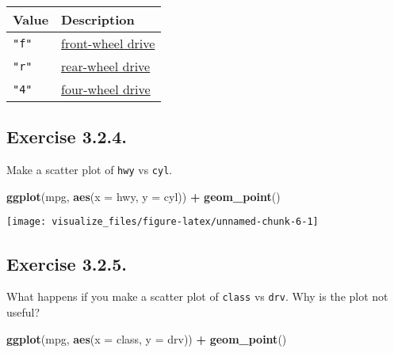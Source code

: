 \documentclass[]{book}
\newenvironment{Shaded}{\begin{snugshade}}{\end{snugshade}}
\newcommand{\DataTypeTok}[1]{\textcolor[rgb]{0.13,0.29,0.53}{#1}}
\newcommand{\KeywordTok}[1]{\textcolor[rgb]{0.13,0.29,0.53}{\textbf{#1}}}
\newcommand{\NormalTok}[1]{#1}
\newcommand{\OperatorTok}[1]{\textcolor[rgb]{0.81,0.36,0.00}{\textbf{#1}}}
\newcommand{\StringTok}[1]{\textcolor[rgb]{0.31,0.60,0.02}{#1}}
\theoremstyle{plain}
\theoremstyle{remark}
\theoremstyle{definition}
\theoremstyle{definition}
\theoremstyle{definition}
\theoremstyle{remark}
\begin{document}
\begin{longtable}[]{@{}ll@{}}
\toprule
Value & Description\tabularnewline
\midrule
\endhead
\texttt{"f"} &
\href{https://en.wikipedia.org/wiki/Front-wheel_drive}{front-wheel
drive}\tabularnewline
\texttt{"r"} &
\href{https://en.wikipedia.org/wiki/Automobile_layout\#Rear-wheel-drive_layouts}{rear-wheel
drive}\tabularnewline
\texttt{"4"} &
\href{https://en.wikipedia.org/wiki/Four-wheel_drive}{four-wheel
drive}\tabularnewline
\bottomrule
\end{longtable}

\hypertarget{exercise-3.2.4.}{%
\subsection*{\texorpdfstring{Exercise
{3.2.4}.}{Exercise 3.2.4.}}\label{exercise-3.2.4.}}

Make a scatter plot of \texttt{hwy} vs \texttt{cyl}.

\begin{Shaded}
\begin{Highlighting}[]
\KeywordTok{ggplot}\NormalTok{(mpg, }\KeywordTok{aes}\NormalTok{(}\DataTypeTok{x =}\NormalTok{ hwy, }\DataTypeTok{y =}\NormalTok{ cyl)) }\OperatorTok{+}
\StringTok{  }\KeywordTok{geom_point}\NormalTok{()}
\end{Highlighting}
\end{Shaded}

\begin{center}\texttt{[image: visualize\_files/figure-latex/unnamed-chunk-6-1]} \end{center}

\hypertarget{exercise-3.2.5.}{%
\subsection*{\texorpdfstring{Exercise
{3.2.5}.}{Exercise 3.2.5.}}\label{exercise-3.2.5.}}

What happens if you make a scatter plot of \texttt{class} vs
\texttt{drv}. Why is the plot not useful?

\begin{Shaded}
\begin{Highlighting}[]
\KeywordTok{ggplot}\NormalTok{(mpg, }\KeywordTok{aes}\NormalTok{(}\DataTypeTok{x =}\NormalTok{ class, }\DataTypeTok{y =}\NormalTok{ drv)) }\OperatorTok{+}
\StringTok{  }\KeywordTok{geom_point}\NormalTok{()}
\end{Highlighting}
\end{Shaded}
\end{document}
